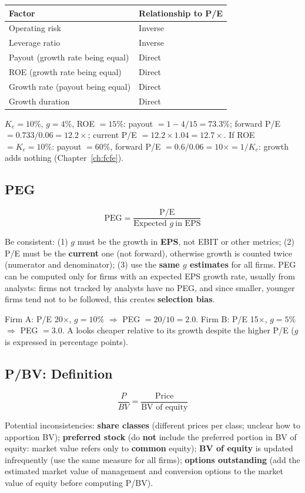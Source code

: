 \begin{center}
\begin{tabular}{@{}ll@{}}
\toprule
\textbf{Factor} & \textbf{Relationship to P/E}\\
\midrule
Operating risk & Inverse\\
Leverage ratio & Inverse\\
Payout (growth rate being equal) & Direct\\
ROE (growth rate being equal) & Direct\\
Growth rate (payout being equal) & Direct\\
Growth duration & Direct\\
\bottomrule
\end{tabular}
\end{center}
\begin{exbox}
$K_e=10\%$, $g=4\%$, ROE $=15\%$: payout $=1-4/15=73.3\%$; forward P/E $=0.733/0.06=\mathbf{12.2\times}$; current P/E $=12.2\times1.04=\mathbf{12.7\times}$. If ROE $=K_e=10\%$: payout $=60\%$, forward P/E $=0.6/0.06=10\times=1/K_e$: growth adds nothing (Chapter~\ref{ch:fcfe}).
\end{exbox}

\subsection{PEG}
\begin{keybox}
\[
\text{PEG}=\frac{\text{P/E}}{\text{Expected }g\ \text{in EPS}}
\]
\end{keybox}
Be consistent: (1) $g$ must be the growth in \textbf{EPS}, not EBIT or other metrics; (2) P/E must be the \textbf{current} one (not forward), otherwise growth is counted twice (numerator and denominator); (3) use the \textbf{same $g$ estimates} for all firms. PEG can be computed only for firms with an expected EPS growth rate, usually from analysts: firms not tracked by analysts have no PEG, and since smaller, younger firms tend not to be followed, this creates \textbf{selection bias}.
\begin{exbox}
Firm A: P/E 20$\times$, $g=10\%$ $\Rightarrow$ PEG $=20/10=2.0$. Firm B: P/E 15$\times$, $g=5\%$ $\Rightarrow$ PEG $=3.0$. A looks cheaper relative to its growth despite the higher P/E ($g$ is expressed in percentage points).
\end{exbox}

\subsection{P/BV: Definition}
\begin{keybox}
\[
\frac{P}{BV}=\frac{\text{Price}}{\text{BV of equity}}
\]
\end{keybox}
Potential inconsistencies: \textbf{share classes} (different prices per class; unclear how to apportion BV); \textbf{preferred stock} (do \textbf{not} include the preferred portion in BV of equity: market value refers only to \textbf{common} equity); \textbf{BV of equity} is updated infrequently (use the same measure for all firms); \textbf{options outstanding} (add the estimated market value of management and conversion options to the market value of equity before computing P/BV).

